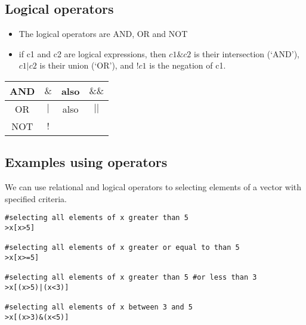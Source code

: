 \subsection{Logical operators}
\begin{itemize}
\item The logical operators are AND, OR and NOT

\item if c1 and c2 are logical expressions, then $c1 \& c2$ is
their intersection (`AND'), $c1 | c2$ is their union (`OR'), and
$!c1$ is the negation of c1.
\end{itemize}
\begin{center}
\begin{tabular}{|c|c|c|c|}
  \hline
  AND & $ \& $ & also  & $\&\&$ \\
  \hline
  OR & $|$ & also & $||$ \\
  \hline
  NOT & $!$ & &  \\
  \hline
\end{tabular}
\end{center}

\subsection{Examples using operators}

We can use relational and logical operators to selecting elements
of a vector with specified criteria.

\begin{verbatim}
#selecting all elements of x greater than 5
>x[x>5]

#selecting all elements of x greater or equal to than 5
>x[x>=5]

#selecting all elements of x greater than 5 #or less than 3
>x[(x>5)|(x<3)]

#selecting all elements of x between 3 and 5
>x[(x>3)&(x<5)]
\end{verbatim}



